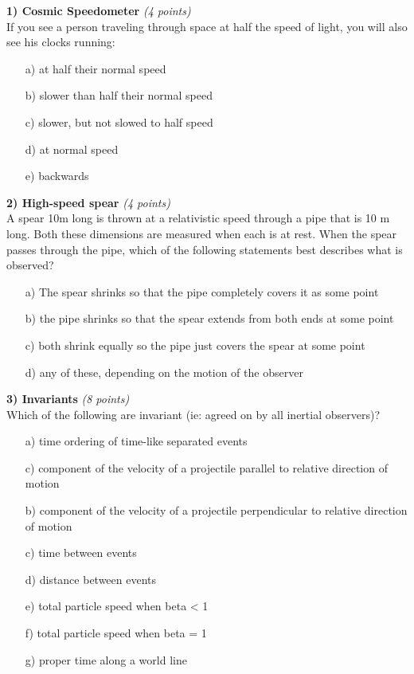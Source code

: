{\large


\textbf{1) Cosmic Speedometer }\hfill \textit{(4 points)}\\
If you see a person traveling through space at half the speed of light, you will also see his clocks running:

\begin{itemize}
\item[a)] at half their normal speed
\item[b)] slower than half their normal speed
\item[c)] slower, but not slowed to half speed
\item[d)] at normal speed
\item[e)] backwards
\end{itemize}

\vspace{0.1in}

\textbf{2) High-speed spear }\hfill \textit{(4 points)}\\
A spear 10m long is thrown at a relativistic speed through a pipe that is 10 m long.
Both these dimensions are measured when each is at rest.
When the spear passes through the pipe, which of the following statements best describes what is observed?
\begin{itemize}
\item[a)] The spear shrinks so that the pipe completely covers it as some point
\item[b)] the pipe shrinks so that the spear extends from both ends at some point
\item[c)] both shrink equally so the pipe just covers the spear at some point
\item[d)] any of these, depending on the motion of the observer
\end{itemize}

\vspace{0.1in}

\textbf{3) Invariants }\hfill \textit{(8 points)}\\
Which of the following are invariant (ie: agreed on by all inertial observers)?
\begin{itemize}
\item[a)] time ordering of time-like separated events
\item[c)] component of the velocity of a projectile parallel to relative direction of motion
\item[b)] component of the velocity of a projectile perpendicular to relative direction of motion
\item[c)] time between events
\item[d)] distance between events
\item[e)] total particle speed when beta < 1
\item[f)] total particle speed when beta = 1
\item[g)] proper time along a world line
\end{itemize}

}
